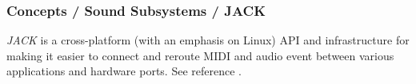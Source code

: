 \subsubsection{Concepts / Sound Subsystems / JACK}
\label{subsubsec:concepts_sound_jack}

   \textsl{JACK} is a cross-platform (with an emphasis on Linux)
   API and infrastructure for making it easier to connect and reroute MIDI
   and audio event between various applications and hardware ports.
   See reference \cite{jack}.

